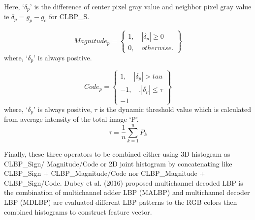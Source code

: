 Here, $‘δ_p’$ is the difference of center pixel gray value and neighbor pixel gray value ie $δ_p = g_p - g_c$ for CLBP\_S.

\begin{equation}
Magnitude_p = \left\{\begin{array}{l} 1, \quad |\delta_p| \ge 0\\ 0, \quad otherwise. \end{array} \right\}
\end{equation}
where, $‘δ_p’$	is always positive.

\begin{equation}
Code_p = \left\{\begin{array}{l} 1, \quad |\delta_p| > tau \\ -1, \quad . |\delta_p| \le \tau \\ -1\end{array} \right\}
\end{equation}
where, $‘δ_p’$	is always positive, $\tau$ is the dynamic threshold value which is calculated from average intensity of the total image ‘P’.
$$
\tau = \frac{1}{n} \sum_{k=1}^{n} P_k
$$

Finally, these three operators to be combined either using 3D histogram as CLBP\_Sign/ Magnitude/Code or 2D joint histogram by concatenating like CLBP_Sign + CLBP\_Magnitude/Code nor CLBP\_Magnitude + CLBP\_Sign/Code.
Dubey et al. (2016) proposed multichannel decoded LBP is the combination of multichannel adder LBP (MALBP) and multichannel decoder LBP (MDLBP) are evaluated different LBP patterns to the RGB colors then combined histograms to construct feature vector.
